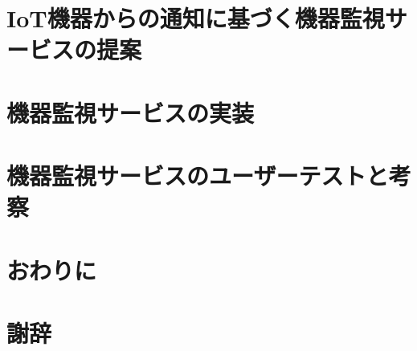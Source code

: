 \documentclass[a4paper]{jreport}
\begin{document}
\chapter{IoT機器からの通知に基づく機器監視サービスの提案}

\chapter{機器監視サービスの実装}

\chapter{機器監視サービスのユーザーテストと考察}


\chapter{おわりに}


\chapter{謝辞}




\begin{comment}
流れ
序論
・IoTが流行している．
  ->何故？
	・コンピューターの高性能化と価格の低下 -> ほんとに？
	・家庭へのインターネットの普及 -> ほんとに？
  -> ほんとに？

・IoTのデバイス監視で困っている．
  -> デバイスの監視が本当に必要なのか？
	・サービスを止めないために必要 -> ほんとに？
  -> 何故デバイスの監視で困っているのか？
	・見に行くわけに行かない．
	  ->何故？
		・設置場所が離れていることがある．-> ほんとに？
		・数が多くて見きれない． -> ほんとに？
	・サービスに組み込むのにも手間がかかる -> ほんとに？
  -> ほんとに？

提案
・IoT機器向けの機器監視サービスを作ったら，楽になるのでは？
  -> 他の解決策はどうなの？何がダメなの？
	・Ping
	・SNMP
	・Influxdb...
	・Elasticksearch...
  -> 他のがダメなのに，コレが何故OKなの？
	・IoTサービスの開発に特化しているため
	  ->どう特化してるの？
		・グラフ作成等の手間が不要
		・一覧して見ることができる
		・機器から通知が送られてくるので，NAPTで突っかからない．
  -> ほんとに？=>検証へ

検証
・田頭さんの研究で使ってもらい評価を得る．
　1. 使い方について簡単に説明
　2. 使っている様子を観測
  3. 最後に聞き取りを実施
-> なんだって？
　・こんな意見が聞けた．
　・サービスについては，〇〇だと言われた．
　・観察している中で，こんな所が気になった．

結論
・確かに楽になった or 楽にならなかった．
 -> 何故？

今後の課題としてこんなことがあった．
 ・
\end{comment}
\end{document}
